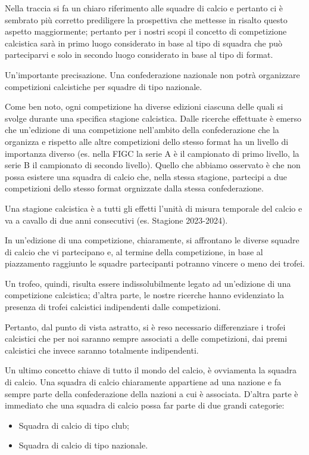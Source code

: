 Nella traccia si fa un chiaro riferimento alle squadre di calcio e pertanto ci è sembrato
più corretto prediligere la prospettiva che mettesse in risalto questo aspetto maggiormente;
pertanto per i nostri scopi il concetto di competizione calcistica sarà in primo luogo
considerato in base al tipo di squadra che può parteciparvi e solo in secondo luogo
considerato in base al tipo di format.

Un'importante precisazione. Una confederazione nazionale non potrà organizzare competizioni
calcistiche per squadre di tipo nazionale.

\bigskip
\bigskip

Come ben noto, ogni competizione ha diverse edizioni ciascuna delle quali si svolge durante
una specifica stagione calcistica.
Dalle ricerche effettuate è emerso che un'edizione di una competizione nell'ambito della
confederazione che la organizza e rispetto alle altre competizioni dello stesso format
ha un livello di importanza diverso (es. nella FIGC la serie A è il campionato di primo
livello, la serie B il campionato di secondo livello).
Quello che abbiamo osservato è che non possa esistere una squadra di calcio che, nella
stessa stagione, partecipi a due competizioni dello stesso format orgnizzate dalla stessa
confederazione.

Una stagione calcistica è a tutti gli effetti l'unità di misura temporale del calcio
e va a cavallo di due anni consecutivi (es. Stagione 2023-2024).

In un'edizione di una competizione, chiaramente, si affrontano le diverse squadre di calcio
che vi partecipano e, al termine della competizione, in base al piazzamento raggiunto le
squadre partecipanti potranno vincere o meno dei trofei.

Un trofeo, quindi, risulta essere indissolubilmente legato ad un'edizione di una competizione
calcistica; d'altra parte, le nostre ricerche hanno evidenziato la presenza di trofei calcistici
indipendenti dalle competizioni.

Pertanto, dal punto di vista astratto, si è reso necessario differenziare i trofei calcistici
che per noi saranno sempre associati a delle competizioni, dai premi calcistici che invece
saranno totalmente indipendenti.

Un ultimo concetto chiave di tutto il mondo del calcio, è ovviamenta la squadra di calcio.
Una squadra di calcio chiaramente appartiene ad una nazione e fa sempre parte della
confederazione della nazioni a cui è associata.
D'altra parte è immediato che una squadra di calcio possa far parte di due grandi categorie:
\begin{itemize}
	\item Squadra di calcio di tipo club;
	\item Squadra di calcio di tipo nazionale.
\end{itemize}

